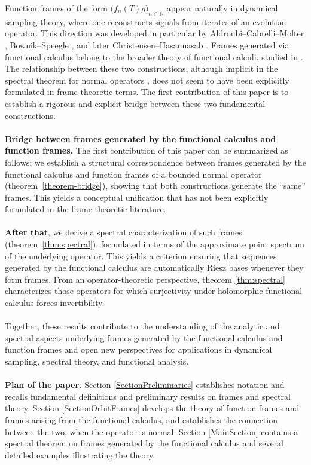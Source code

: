 \documentclass[a4paper,11pt]{article}
\theoremstyle{plain}
\theoremstyle{definition}
\theoremstyle{remark}
\begin{document}
Function frames of the form $ \big(f_n(T)g\big)_{n\in\mathbb{N}}$ appear naturally in dynamical sampling theory, where one reconstructs signals from iterates of an evolution operator. This direction was developed in particular by Aldroubi–Cabrelli–Molter \cite{AldroubiCabrelliMolter2014,AldroubiCabrelliMolter2018}, Bownik–Speegle \cite{BownikSpeegle2015}, and later Christensen–Hasannasab \cite{ChristensenHasannasab2017-1, ChristensenHasannasab2017-2}. Frames generated via functional calculus belong to the broader theory of functional calculi, studied in \cite{Haase2006,Nikolski2002,Taylor1972}. 
The relationship between these two constructions, although implicit in the spectral theorem for normal operators \cite{Conway1990, NagyFoiasBercoviciKerchy2010, Nikolski2002}, does not seem to have been explicitly formulated in frame-theoretic terms.
The first contribution of this paper is to establish a rigorous and explicit bridge between these two fundamental constructions. \\ \\
\textbf{Bridge between frames generated by the functional calculus and function frames.} The first contribution of this paper can be summarized as follows: we establish a structural correspondence between frames generated by the functional calculus and function frames of a bounded normal operator (theorem~\ref{theorem-bridge}), showing that both constructions generate the ``same'' frames. This yields a conceptual unification that has not been explicitly formulated in the frame-theoretic literature.  \\ \\
\textbf{After that}, we derive a spectral characterization of such frames (theorem~\ref{thm:spectral}), formulated in terms of the approximate point spectrum of the underlying operator. This yields a criterion ensuring that sequences generated by the functional calculus are automatically Riesz bases whenever they form frames. From an operator-theoretic perspective, theorem \ref{thm:spectral} characterizes those operators for which surjectivity under holomorphic functional calculus forces invertibility. \\ \\
Together, these results contribute to the understanding of the analytic and spectral aspects underlying frames generated by the functional calculus and function frames and open new perspectives for applications in dynamical sampling, spectral theory, and functional analysis. \\ \\
\textbf{Plan of the paper.} Section \ref{SectionPreliminaries} establishes notation and recalls fundamental definitions and preliminary results on frames and spectral theory. Section \ref{SectionOrbitFrames} develops the theory of function frames and frames arising from the functional calculus, and establishes the connection between the two, when the operator is normal. Section \ref{MainSection} contains a spectral theorem on frames generated by the functional calculus and several detailed examples illustrating the theory.
\end{document}
